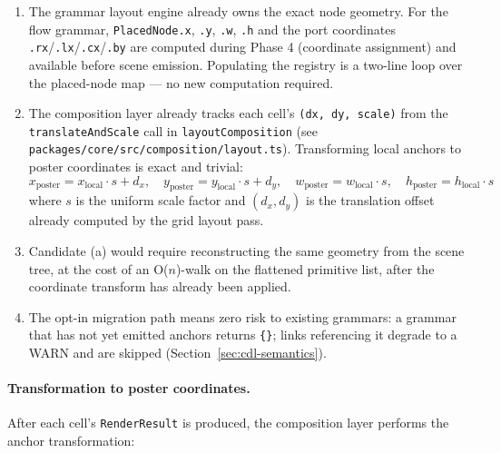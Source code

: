 \begin{enumerate}
  \item The grammar layout engine already owns the exact node geometry.  For
        the flow grammar, \texttt{PlacedNode.x}, \texttt{.y}, \texttt{.w},
        \texttt{.h} and the port coordinates \texttt{.rx}/\texttt{.lx}/\texttt{.cx}/\texttt{.by}
        are computed during Phase 4 (coordinate assignment) and available
        before scene emission.  Populating the registry is a two-line loop over
        the placed-node map --- no new computation required.
  \item The composition layer already tracks each cell's
        \texttt{(dx, dy, scale)} from the \texttt{translateAndScale} call in
        \texttt{layoutComposition} (see \texttt{packages/core/src/composition/layout.ts}).
        Transforming local anchors to poster coordinates is exact and trivial:
        \[
          x_{\mathrm{poster}} = x_{\mathrm{local}} \cdot s + d_x, \quad
          y_{\mathrm{poster}} = y_{\mathrm{local}} \cdot s + d_y, \quad
          w_{\mathrm{poster}} = w_{\mathrm{local}} \cdot s, \quad
          h_{\mathrm{poster}} = h_{\mathrm{local}} \cdot s
        \]
        where $s$ is the uniform scale factor and $(d_x, d_y)$ is the
        translation offset already computed by the grid layout pass.
  \item Candidate (a) would require reconstructing the same geometry from the
        scene tree, at the cost of an O($n$)-walk on the flattened primitive
        list, after the coordinate transform has already been applied.
  \item The opt-in migration path means zero risk to existing grammars:
        a grammar that has not yet emitted anchors returns \texttt{\{\}};
        links referencing it degrade to a WARN and are skipped
        (Section~\ref{sec:cdl-semantics}).
\end{enumerate}

\paragraph{Transformation to poster coordinates.}

After each cell's \texttt{RenderResult} is produced, the composition layer
performs the anchor transformation:

